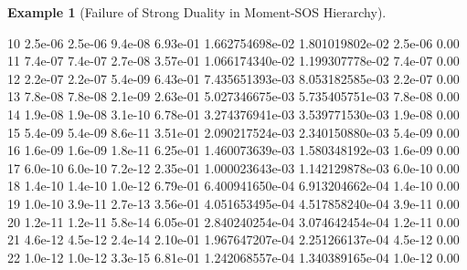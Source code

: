 \documentclass[
]{book}
\newenvironment{Shaded}{\begin{snugshade}}{\end{snugshade}}
\newcommand{\FloatTok}[1]{\textcolor[rgb]{0.00,0.00,0.81}{#1}}
\theoremstyle{definition}
\theoremstyle{definition}
\newtheorem{example}{Example}[chapter]
\theoremstyle{definition}
\theoremstyle{definition}
\theoremstyle{remark}
\begin{document}
\begin{example}[Failure of Strong Duality in Moment-SOS Hierarchy]
\begin{Shaded}
\begin{Highlighting}[]
\FloatTok{10}  \FloatTok{2.5e{-}06}  \FloatTok{2.5e{-}06}  \FloatTok{9.4e{-}08}  \FloatTok{6.93e{-}01}   \FloatTok{1.662754698e{-}02}   \FloatTok{1.801019802e{-}02}   \FloatTok{2.5e{-}06}  \FloatTok{0.00}  
\FloatTok{11}  \FloatTok{7.4e{-}07}  \FloatTok{7.4e{-}07}  \FloatTok{2.7e{-}08}  \FloatTok{3.57e{-}01}   \FloatTok{1.066174340e{-}02}   \FloatTok{1.199307778e{-}02}   \FloatTok{7.4e{-}07}  \FloatTok{0.00}  
\FloatTok{12}  \FloatTok{2.2e{-}07}  \FloatTok{2.2e{-}07}  \FloatTok{5.4e{-}09}  \FloatTok{6.43e{-}01}   \FloatTok{7.435651393e{-}03}   \FloatTok{8.053182585e{-}03}   \FloatTok{2.2e{-}07}  \FloatTok{0.00}  
\FloatTok{13}  \FloatTok{7.8e{-}08}  \FloatTok{7.8e{-}08}  \FloatTok{2.1e{-}09}  \FloatTok{2.63e{-}01}   \FloatTok{5.027346675e{-}03}   \FloatTok{5.735405751e{-}03}   \FloatTok{7.8e{-}08}  \FloatTok{0.00}  
\FloatTok{14}  \FloatTok{1.9e{-}08}  \FloatTok{1.9e{-}08}  \FloatTok{3.1e{-}10}  \FloatTok{6.78e{-}01}   \FloatTok{3.274376941e{-}03}   \FloatTok{3.539771530e{-}03}   \FloatTok{1.9e{-}08}  \FloatTok{0.00}  
\FloatTok{15}  \FloatTok{5.4e{-}09}  \FloatTok{5.4e{-}09}  \FloatTok{8.6e{-}11}  \FloatTok{3.51e{-}01}   \FloatTok{2.090217524e{-}03}   \FloatTok{2.340150880e{-}03}   \FloatTok{5.4e{-}09}  \FloatTok{0.00}  
\FloatTok{16}  \FloatTok{1.6e{-}09}  \FloatTok{1.6e{-}09}  \FloatTok{1.8e{-}11}  \FloatTok{6.25e{-}01}   \FloatTok{1.460073639e{-}03}   \FloatTok{1.580348192e{-}03}   \FloatTok{1.6e{-}09}  \FloatTok{0.00}  
\FloatTok{17}  \FloatTok{6.0e{-}10}  \FloatTok{6.0e{-}10}  \FloatTok{7.2e{-}12}  \FloatTok{2.35e{-}01}   \FloatTok{1.000023643e{-}03}   \FloatTok{1.142129878e{-}03}   \FloatTok{6.0e{-}10}  \FloatTok{0.00}  
\FloatTok{18}  \FloatTok{1.4e{-}10}  \FloatTok{1.4e{-}10}  \FloatTok{1.0e{-}12}  \FloatTok{6.79e{-}01}   \FloatTok{6.400941650e{-}04}   \FloatTok{6.913204662e{-}04}   \FloatTok{1.4e{-}10}  \FloatTok{0.00}  
\FloatTok{19}  \FloatTok{1.0e{-}10}  \FloatTok{3.9e{-}11}  \FloatTok{2.7e{-}13}  \FloatTok{3.56e{-}01}   \FloatTok{4.051653495e{-}04}   \FloatTok{4.517858240e{-}04}   \FloatTok{3.9e{-}11}  \FloatTok{0.00}  
\FloatTok{20}  \FloatTok{1.2e{-}11}  \FloatTok{1.2e{-}11}  \FloatTok{5.8e{-}14}  \FloatTok{6.05e{-}01}   \FloatTok{2.840240254e{-}04}   \FloatTok{3.074642454e{-}04}   \FloatTok{1.2e{-}11}  \FloatTok{0.00}  
\FloatTok{21}  \FloatTok{4.6e{-}12}  \FloatTok{4.5e{-}12}  \FloatTok{2.4e{-}14}  \FloatTok{2.10e{-}01}   \FloatTok{1.967647207e{-}04}   \FloatTok{2.251266137e{-}04}   \FloatTok{4.5e{-}12}  \FloatTok{0.00}  
\FloatTok{22}  \FloatTok{1.0e{-}12}  \FloatTok{1.0e{-}12}  \FloatTok{3.3e{-}15}  \FloatTok{6.81e{-}01}   \FloatTok{1.242068557e{-}04}   \FloatTok{1.340389165e{-}04}   \FloatTok{1.0e{-}12}  \FloatTok{0.00}  

\end{Highlighting}
\end{Shaded}
\end{example}
\end{document}
